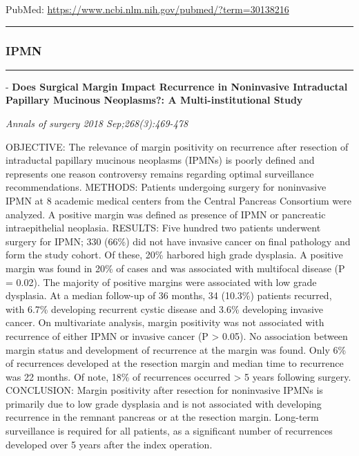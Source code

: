 \documentclass[]{article}
\begin{document}
PubMed: \url{https://www.ncbi.nlm.nih.gov/pubmed/?term=30138216}

{}

{}

\begin{center}\rule{0.5\linewidth}{\linethickness}\end{center}

\hypertarget{ipmn}{%
\subsubsection{IPMN}\label{ipmn}}

\begin{center}\rule{0.5\linewidth}{\linethickness}\end{center}

 - \textbf{Does Surgical Margin Impact Recurrence in Noninvasive
Intraductal Papillary Mucinous Neoplasms?: A Multi-institutional Study}

\emph{Annals of surgery 2018 Sep;268(3):469-478}

OBJECTIVE: The relevance of margin positivity on recurrence after
resection of intraductal papillary mucinous neoplasms (IPMNs) is poorly
defined and represents one reason controversy remains regarding optimal
surveillance recommendations. METHODS: Patients undergoing surgery for
noninvasive IPMN at 8 academic medical centers from the Central Pancreas
Consortium were analyzed. A positive margin was defined as presence of
IPMN or pancreatic intraepithelial neoplasia. RESULTS: Five hundred two
patients underwent surgery for IPMN; 330 (66\%) did not have invasive
cancer on final pathology and form the study cohort. Of these, 20\%
harbored high grade dysplasia. A positive margin was found in 20\% of
cases and was associated with multifocal disease (P = 0.02). The
majority of positive margins were associated with low grade dysplasia.
At a median follow-up of 36 months, 34 (10.3\%) patients recurred, with
6.7\% developing recurrent cystic disease and 3.6\% developing invasive
cancer. On multivariate analysis, margin positivity was not associated
with recurrence of either IPMN or invasive cancer (P \textgreater{}
0.05). No association between margin status and development of
recurrence at the margin was found. Only 6\% of recurrences developed at
the resection margin and median time to recurrence was 22 months. Of
note, 18\% of recurrences occurred \textgreater{} 5 years following
surgery. CONCLUSION: Margin positivity after resection for noninvasive
IPMNs is primarily due to low grade dysplasia and is not associated with
developing recurrence in the remnant pancreas or at the resection
margin. Long-term surveillance is required for all patients, as a
significant number of recurrences developed over 5 years after the index
operation.
\end{document}
